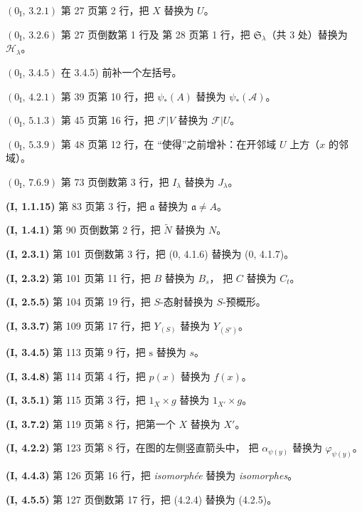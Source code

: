 \documentclass[UTF8,fontset=none,11pt,oneside,openany]{ctexbook}
\begin{document}
\noindent\textbf{$(0_{\mathrm I},\,3.2.1)$} 第 27 页第 2 行，把 $X$
替换为 $U$。

\noindent\textbf{$(0_{\mathrm I},\,3.2.6)$} 第 27 页倒数第 1 行及
第 28 页第 1 行，把 $\mathfrak S_\lambda$（共 3 处）替换为
$\mathscr H_\lambda$。

\noindent\textbf{$(0_{\mathrm I},\,3.4.5)$} 在 3.4.5) 前补一个左括号。

\noindent\textbf{$(0_{\mathrm I},\,4.2.1)$} 第 39 页第 10 行，把
$\psi_*(A)$ 替换为 $\psi_*(\mathscr A)$。

\noindent\textbf{$(0_{\mathrm I},\,5.1.3)$} 第 45 页第 16 行，把
$\mathscr F|V$ 替换为 $\mathscr F|U$。

\noindent\textbf{$(0_{\mathrm I},\,5.3.9)$} 第 48 页第 12 行，在
“使得”之前增补：在开邻域 $U$ 上方（$x$ 的邻域）。

\noindent\textbf{$(0_{\mathrm I},\,7.6.9)$} 第 73 页倒数第 3 行，把
$I_\lambda$ 替换为 $J_\lambda$。

\noindent\textbf{(I, 1.1.15)} 第 83 页第 3 行，把 $\mathfrak a$
替换为 $\mathfrak a\ne A$。

\noindent\textbf{(I, 1.4.1)} 第 90 页倒数第 2 行，把 $\widetilde N$
替换为 $N$。

\noindent\textbf{(I, 2.3.1)} 第 101 页倒数第 3 行，把 (0, 4.1.6)
替换为 (0, 4.1.7)。

\noindent\textbf{(I, 2.3.2)} 第 101 页第 11 行，把 $B$ 替换为 $B_s$，
把 $C$ 替换为 $C_t$。

\noindent\textbf{(I, 2.5.5)} 第 104 页第 19 行，把 $S$-态射替换为
$S$-预概形。

\noindent\textbf{(I, 3.3.7)} 第 109 页第 17 行，把 $Y_{(S)}$ 替换为
$Y_{(S')}$。

\noindent\textbf{(I, 3.4.5)} 第 113 页第 9 行，把 $\mathrm s$
替换为 $s$。

\noindent\textbf{(I, 3.4.8)} 第 114 页第 4 行，把 $p(x)$ 替换为
$f(x)$。

\noindent\textbf{(I, 3.5.1)} 第 115 页第 3 行，把 $1_X\times g$
替换为 $1_{X'}\times g$。

\noindent\textbf{(I, 3.7.2)} 第 119 页第 8 行，把第一个 $X$
替换为 $X'$。

\noindent\textbf{(I, 4.2.2)} 第 123 页第 8 行，在图的左侧竖直箭头中，
把 $\alpha_{\psi(y)}$ 替换为 $\varphi_{\psi(y)}$。

\noindent\textbf{(I, 4.4.3)} 第 126 页第 16 行，把
\emph{isomorphée} 替换为 \emph{isomorphes}。

\noindent\textbf{(I, 4.5.5)} 第 127 页倒数第 17 行，把 (4.2.4)
替换为 (4.2.5)。
\end{document}
